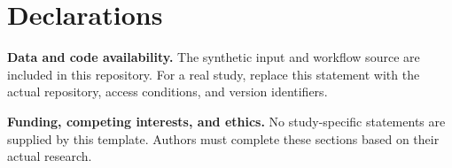 \section*{Declarations}
\textbf{Data and code availability.} The synthetic input and workflow source are
included in this repository. For a real study, replace this statement with the
actual repository, access conditions, and version identifiers.

\noindent\textbf{Funding, competing interests, and ethics.} No study-specific
statements are supplied by this template. Authors must complete these sections
based on their actual research.
